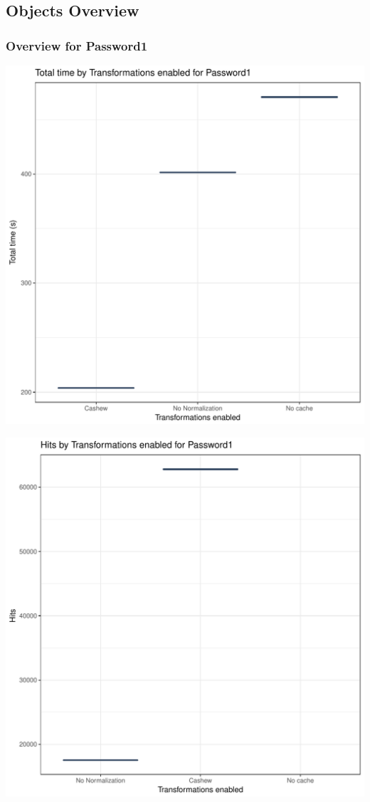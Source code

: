 \documentclass{article}\usepackage[]{graphicx}\usepackage[]{color}
\makeatletter
\def\maxwidth{ %
  \ifdim\Gin@nat@width>\linewidth
    \linewidth
  \else
    \Gin@nat@width
  \fi
}
\newenvironment{knitrout}{}{} %
\makeatother
\begin{document}
\subsection{Objects Overview}
\subsubsection{Overview for Password1}
\begin{knitrout}
\color{fgcolor}
\includegraphics[width=\maxwidth]{figure/password-1} 

\includegraphics[width=\maxwidth]{figure/password-2} 


\end{knitrout}
\end{document}

